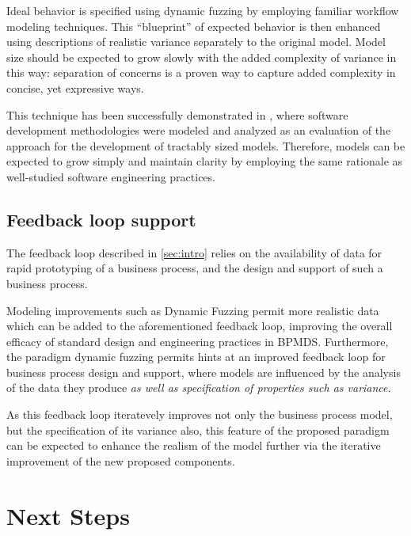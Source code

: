 \documentclass[12pt]{llncs}  %
\begin{document}
Ideal behavior is specified using dynamic fuzzing by employing familiar workflow
modeling techniques. This ``blueprint'' of expected behavior is then enhanced
using descriptions of realistic variance separately to the original model. Model
size should be expected to grow slowly with the added complexity of variance in
this way: separation of concerns is a proven way to capture added complexity in
concise, yet expressive ways\citep{kiczales1997aspect}.
\par

This technique has been successfully demonstrated in \cite{wallis2018modelling},
where software development methodologies were modeled and analyzed as an
evaluation of the approach for the development of tractably sized models.
Therefore, models can be expected to grow simply and maintain clarity by
employing the same rationale as well-studied software engineering practices.
\par

\subsection{Feedback loop support}
The feedback loop described in \cref{sec:intro} relies on the availability of data for rapid prototyping of a
business process, and the design and support of such a business process.
\par

Modeling improvements such as Dynamic Fuzzing permit more realistic data which
can be added to the aforementioned feedback loop, improving the overall efficacy
of standard design and engineering practices in BPMDS. Furthermore, the paradigm
dynamic fuzzing permits hints at an improved feedback loop for business process
design and support, where models are influenced by the analysis of the data they
produce \emph{as well as specification of properties such as variance}. 
\par


As this feedback loop iteratevely improves not only the business process model,
but the specification of its variance also, this feature of the proposed
paradigm can be expected to enhance the realism of the model further via the
iterative improvement of the new proposed components.
\par



\section{Next Steps}
\label{sec:future_work}
\label{sec:conclusion}




\end{document}
